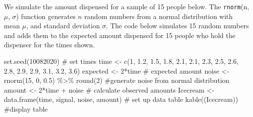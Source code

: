 \documentclass[
  letterpaper,
  DIV=11,
  numbers=noendperiod]{scrreprt}
\newenvironment{Shaded}{\begin{snugshade}}{\end{snugshade}}
\newcommand{\CommentTok}[1]{\textcolor[rgb]{0.37,0.37,0.37}{#1}}
\newcommand{\DecValTok}[1]{\textcolor[rgb]{0.68,0.00,0.00}{#1}}
\newcommand{\FloatTok}[1]{\textcolor[rgb]{0.68,0.00,0.00}{#1}}
\newcommand{\FunctionTok}[1]{\textcolor[rgb]{0.28,0.35,0.67}{#1}}
\newcommand{\NormalTok}[1]{\textcolor[rgb]{0.00,0.23,0.31}{#1}}
\newcommand{\OtherTok}[1]{\textcolor[rgb]{0.00,0.23,0.31}{#1}}
\newcommand{\SpecialCharTok}[1]{\textcolor[rgb]{0.37,0.37,0.37}{#1}}
\begin{document}
We simulate the amount dispensed for a sample of 15 people below. The
\texttt{rnorm}(n, \(\mu\), \(\sigma\)) function generates \(n\) random
numbers from a normal distribution with mean \(\mu\), and standard
deviation \(\sigma\). The code below simulates 15 random numbers and
adds them to the expected amount dispensed for 15 people who hold the
dispenser for the times shown.

\begin{Shaded}
\begin{Highlighting}[]
\FunctionTok{set.seed}\NormalTok{(}\DecValTok{10082020}\NormalTok{)}
\CommentTok{\# set times }
\NormalTok{time }\OtherTok{\textless{}{-}} \FunctionTok{c}\NormalTok{(}\DecValTok{1}\NormalTok{, }\FloatTok{1.2}\NormalTok{, }\FloatTok{1.5}\NormalTok{, }\FloatTok{1.8}\NormalTok{, }\FloatTok{2.1}\NormalTok{, }\FloatTok{2.1}\NormalTok{, }\FloatTok{2.3}\NormalTok{, }\FloatTok{2.5}\NormalTok{, }\FloatTok{2.6}\NormalTok{, }\FloatTok{2.8}\NormalTok{, }\FloatTok{2.9}\NormalTok{, }\FloatTok{2.9}\NormalTok{, }\FloatTok{3.1}\NormalTok{, }\FloatTok{3.2}\NormalTok{, }\FloatTok{3.6}\NormalTok{)}
\NormalTok{expected }\OtherTok{\textless{}{-}} \DecValTok{2}\SpecialCharTok{*}\NormalTok{time  }\CommentTok{\# expected amount}
\NormalTok{noise }\OtherTok{\textless{}{-}}\FunctionTok{rnorm}\NormalTok{(}\DecValTok{15}\NormalTok{, }\DecValTok{0}\NormalTok{, }\FloatTok{0.5}\NormalTok{) }\SpecialCharTok{\%\textgreater{}\%} \FunctionTok{round}\NormalTok{(}\DecValTok{2}\NormalTok{)  }\CommentTok{\#generate noise from normal distribution}
\NormalTok{amount }\OtherTok{\textless{}{-}} \DecValTok{2}\SpecialCharTok{*}\NormalTok{time }\SpecialCharTok{+}\NormalTok{ noise  }\CommentTok{\# calculate observed amounts}
\NormalTok{Icecream }\OtherTok{\textless{}{-}} \FunctionTok{data.frame}\NormalTok{(time, signal, noise, amount) }\CommentTok{\# set up data table}
\FunctionTok{kable}\NormalTok{((Icecream)) }\CommentTok{\#display table}
\end{Highlighting}
\end{Shaded}
\end{document}
